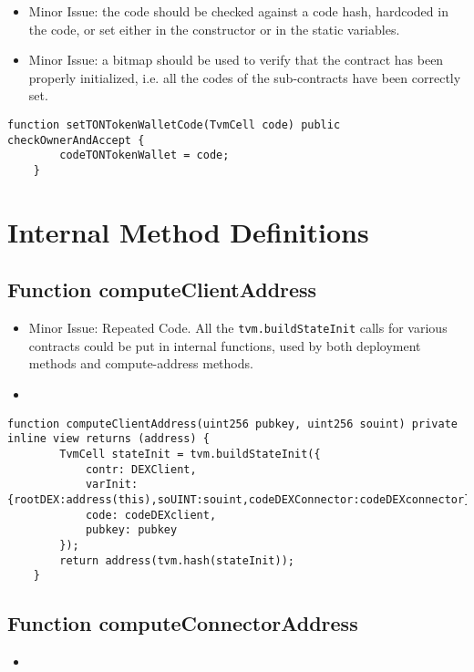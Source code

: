 \begin{itemize}
\item Minor Issue: the code should be checked against a code hash,
  hardcoded in the code, or set either in the constructor or in the
  static variables.
\item Minor Issue: a bitmap should be used to verify that the contract
  has been properly initialized, i.e. all the codes of the
  sub-contracts have been correctly set.
\end{itemize}

\begin{lstlisting}[firstnumber=96]
	function setTONTokenWalletCode(TvmCell code) public checkOwnerAndAccept {
		codeTONTokenWallet = code;
	}
\end{lstlisting}

\section{Internal Method Definitions}


\subsection{Function computeClientAddress}

\begin{itemize}
\item Minor Issue: Repeated Code. All the {\tt tvm.buildStateInit}
  calls for various contracts could be put in internal functions, used
  by both deployment methods and compute-address methods.
\item \issueInternal
\end{itemize}

\begin{lstlisting}[firstnumber=108]
	function computeClientAddress(uint256 pubkey, uint256 souint) private inline view returns (address) {
		TvmCell stateInit = tvm.buildStateInit({
			contr: DEXClient,
			varInit: {rootDEX:address(this),soUINT:souint,codeDEXConnector:codeDEXconnector},
			code: codeDEXclient,
			pubkey: pubkey
		});
		return address(tvm.hash(stateInit));
	}
\end{lstlisting}

\subsection{Function computeConnectorAddress}

\begin{itemize}
\item \issueInternal
\end{itemize}


